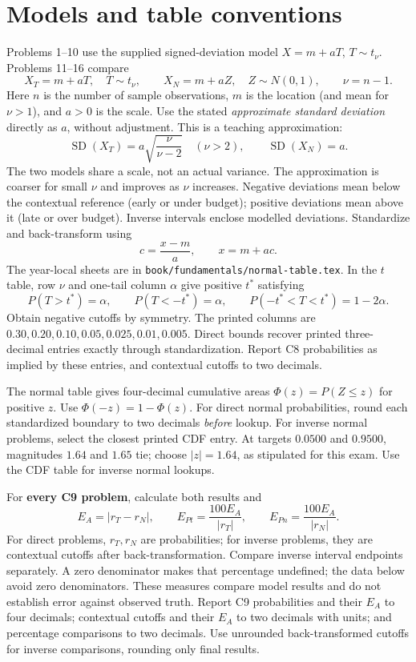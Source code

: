 \section*{Models and table conventions}
Problems 1--10 use the supplied signed-deviation model $X=m+aT$, $T\sim t_\nu$.
Problems 11--16 compare
\[
 X_T=m+aT,\quad T\sim t_\nu,\qquad X_N=m+aZ,\quad Z\sim N(0,1),
 \qquad \boxed{\nu=n-1}.
\]
Here $n$ is the number of sample observations, $m$ is the location (and mean for $\nu>1$), and $a>0$ is the scale.
Use the stated \emph{approximate standard deviation} directly as $a$, without adjustment.
This is a teaching approximation:
\[
 \operatorname{SD}(X_T)=a\sqrt{\frac{\nu}{\nu-2}}\quad(\nu>2),
 \qquad \operatorname{SD}(X_N)=a.
\]
The two models share a scale, not an actual variance. The approximation is coarser for small $\nu$ and improves as $\nu$ increases.
Negative deviations mean below the contextual reference (early or under budget); positive deviations mean above it (late or over budget).
Inverse intervals enclose modelled deviations. Standardize and back-transform using
\[
 \boxed{c=\frac{x-m}{a}},\qquad \boxed{x=m+ac}.
\]
The year-local sheets are in \texttt{book/fundamentals/normal-table.tex}.
In the $t$ table, row $\nu$ and one-tail column $\alpha$ give positive $t^*$ satisfying
\[
 P(T>t^*)=\alpha,\qquad P(T<-t^*)=\alpha,\qquad
 P(-t^*<T<t^*)=1-2\alpha.
\]
Obtain negative cutoffs by symmetry. The printed columns are
$0.30,0.20,0.10,0.05,0.025,0.01,0.005$.
Direct bounds recover printed three-decimal entries exactly through standardization.
Report C8 probabilities as implied by these entries, and contextual cutoffs to two decimals.

The normal table gives four-decimal cumulative areas $\Phi(z)=P(Z\le z)$ for positive $z$.
Use $\Phi(-z)=1-\Phi(z)$. For direct normal probabilities, round each standardized boundary to two decimals \emph{before} lookup.
For inverse normal problems, select the closest printed CDF entry.
At targets $0.0500$ and $0.9500$, magnitudes $1.64$ and $1.65$ tie; choose $|z|=1.64$, as stipulated for this exam.
Use the CDF table for inverse normal lookups.

For \textbf{every C9 problem}, calculate both results and
\[
 E_A=|r_T-r_N|,\qquad E_{Pt}=\frac{100E_A}{|r_T|},\qquad
 E_{Pn}=\frac{100E_A}{|r_N|}.
\]
For direct problems, $r_T,r_N$ are probabilities; for inverse problems, they are contextual cutoffs after back-transformation.
Compare inverse interval endpoints separately.
A zero denominator makes that percentage undefined; the data below avoid zero denominators.
These measures compare model results and do not establish error against observed truth.
Report C9 probabilities and their $E_A$ to four decimals; contextual cutoffs and their $E_A$ to two decimals with units; and percentage comparisons to two decimals.
Use unrounded back-transformed cutoffs for inverse comparisons, rounding only final results.

